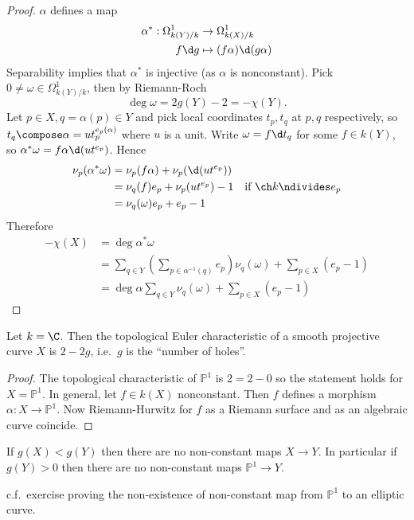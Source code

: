 \documentclass[a4paper]{article}
\renewcommand*{\P}{\mathbb{P}}
\begin{document}
\begin{proof}
  \(\alpha\) defines a map
  \begin{align*}
    \alpha^*: \Omega^1_{k(Y)/k} &\to \Omega^1_{k(X)/k} \\
    f \d g &\mapsto (f \alpha) \d (g\alpha)
  \end{align*}
  Separability implies that \(\alpha^*\) is injective (as \(\alpha\) is nonconstant). Pick \(0 \neq \omega \in \Omega^1_{k(Y)/k}\), then by Riemann-Roch
  \[
    \deg \omega = 2 g(Y) - 2 = - \chi(Y).
  \]
  Let \(p \in X, q = \alpha(p) \in Y\) and pick local coordinates \(t_p, t_q\) at \(p, q\) respectively, so \(t_q \compose \alpha = u t_p^{e_p(\alpha)}\) where \(u\) is a unit. Write \(\omega = f \d t_q\) for some \(f \in k(Y)\), so \(\alpha^* \omega = f \alpha \d (u t^{e_p})\). Hence
  \begin{align*}
    \nu_p(\alpha^* \omega)
    &= \nu_p(f \alpha) + \nu_p(\d (ut^{e_p})) \\
    &= \nu_q(f) e_p + \nu_p(u t^{e_p}) - 1 \quad \text{if } \ch k \ndivides e_p \\
    &= \nu_q(\omega) e_p + e_p - 1
  \end{align*}
  Therefore
  \begin{align*}
    -\chi(X)
    &= \deg \alpha^* \omega \\
    &= \sum_{q \in Y} (\sum_{p \in \alpha^{-1}(q)} e_p) \nu_q(\omega) + \sum_{p \in X} (e_p - 1) \\
    &= \deg \alpha \sum_{q \in Y} \nu_q(\omega) + \sum_{p \in X} (e_p - 1)
  \end{align*}
\end{proof}

\begin{corollary}
  Let \(k = \C\). Then the topological Euler characteristic of a smooth projective curve \(X\) is \(2 - 2g\), i.e.\ \(g\) is the ``number of holes''.
\end{corollary}

\begin{proof}
  The topological characteristic of \(\P^1\) is \(2 = 2 - 0\) so the statement holds for \(X = \P^1\). In general, let \(f \in k(X)\) nonconstant. Then \(f\) defines a morphism \(\alpha: X \to \P^1\). Now Riemann-Hurwitz for \(f\) as a Riemann surface and as an algebraic curve coincide.
\end{proof}

\begin{corollary}
  If \(g(X) < g(Y)\) then there are no non-constant maps \(X \to Y\). In particular if \(g(Y) > 0\) then there are no non-constant maps \(\P^1 \to Y\).
\end{corollary}
c.f.\ exercise proving the non-existence of non-constant map from \(\P^1\) to an elliptic curve.
\end{document}
